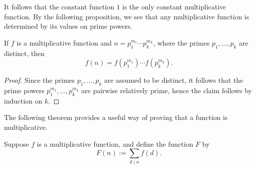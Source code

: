 It follows that the constant function $1$ is the only constant multiplicative function.
By the following proposition, we see that any multiplicative function is determined by its values on prime powers.

\begin{proposition}
  If $f$ is a multiplicative function and $n=p_1^{m_1}\cdots p_k^{m_k}$, where the primes $p_1,\ldots,p_k$ are distinct, then
  \begin{equation*}
    f(n)=f(p_1^{m_1})\cdots f(p_k^{m_k}).
  \end{equation*}
\end{proposition}

\begin{proof}
  Since the primes $p_1,\ldots,p_k$ are assumed to be distinct, it follows that the prime powers $p_1^{m_1},\ldots,p_k^{m_k}$ are pairwise relatively prime, hence the claim follows by induction on $k$.
\end{proof}

The following theorem provides a useful way of proving that a function is multiplicative.

\begin{theorem}\label{theorem:multiplicative-functions}
  Suppose $f$ is a multiplicative function, and define the function $F$ by
  \begin{equation*}
    F(n):=\sum_{d\mid n}f(d).
  \end{equation*}
\end{theorem}

